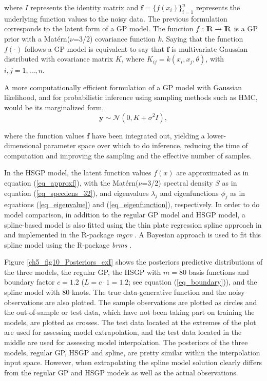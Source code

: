 \documentclass[onecolumn,a4paper,11pt]{article}
\begin{document}
\noindent where $I$ represents the identity matrix and $\bm{f}=\{f(x_i)\}_{i=1}^n$ represents the underlying function values to the noisy data. The previous formulation corresponds to the latent form of a GP model. The function $f:{\rm I\!R} \to {\rm I\!R}$ is a GP prior with a Mat{\'e}rn($\nu$=3/2) covariance function $k$. Saying that the function $f(\cdot)$ follows a GP model is equivalent to say that $\bm{f}$ is multivariate Gaussian distributed with covariance matrix $K$, where $K_{ij}=k(x_i,x_j,\theta)$, with $i,j=1,\dots,n$.
 
A more computationally efficient formulation of a GP model with Gaussian likelihood, and for probabilistic inference using sampling methods such as HMC, would be its marginalized form,
%
\begin{equation*}\label{ch5_eq_marginalizedgp_simudata1}
\bm{y} \sim \mathcal{N}(0, K + \sigma^2 I ),
\end{equation*}

\noindent where the function values $\bm{f}$ have been integrated out, yielding a lower-dimensional parameter space over which to do inference, reducing the time of computation and improving the sampling and the effective number of samples.

In the HSGP model, the latent function values $f(x)$ are approximated as in equation (\ref{eq_approxf}), with the Mat{\'e}rn($\nu$=3/2) spectral density $S$ as in equation (\ref{eq_specdens_32}), and eigenvalues $\lambda_j$ and eigenfunctions $\phi_j$ as in equations (\ref{eq_eigenvalue}) and (\ref{eq_eigenfunction}), respectively. 
In order to do model comparison, in addition to the regular GP model and HSGP model, a spline-based model is also fitted using the thin plate regression spline approach in \cite{wood2003thin} and implemented in the R-package \textit{mgcv} \citep{wood2015package}. A Bayesian approach is used to fit this spline model using the R-package \textit{brms} \citep{burkner2017brms}.

Figure \ref{ch5_fig10_Posteriors_exI} shows the posteriors predictive distributions of the three models, the regular GP, the HSGP with $m=80$ basis functions and boundary factor $c=1.2$ ($L=c\cdot 1= 1.2$; see equation (\ref{eq_boundary})), and the spline model with 80 knots. The true data-generative function and the noisy observations are also plotted. The sample observations are plotted as circles and the out-of-sample or test data, which have not been taking part on training the models, are plotted as crosses. The test data located at the extremes of the plot are used for assessing model extrapolation, and the test data located in the middle are used for assessing model interpolation. The posteriors of the three models, regular GP, HSGP and spline, are pretty similar within the interpolation input space. However, when extrapolating the spline model solution clearly differs from the regular GP and HSGP models as well as the actual observations. 
\end{document}
